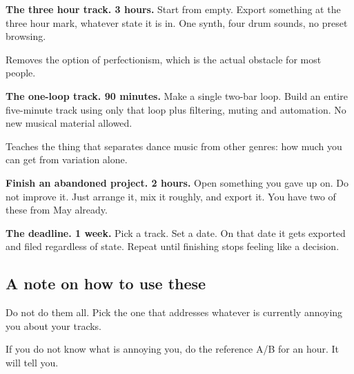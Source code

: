 \textbf{The three hour track. 3 hours.}
Start from empty. Export something at the three hour mark, whatever state it is in. One
synth, four drum sounds, no preset browsing.

Removes the option of perfectionism, which is the actual obstacle for most people.

\textbf{The one-loop track. 90 minutes.}
Make a single two-bar loop. Build an entire five-minute track using only that loop plus
filtering, muting and automation. No new musical material allowed.

Teaches the thing that separates dance music from other genres: how much you can get from
variation alone.

\textbf{Finish an abandoned project. 2 hours.}
Open something you gave up on. Do not improve it. Just arrange it, mix it roughly, and export
it. You have two of these from May already.

\textbf{The deadline. 1 week.}
Pick a track. Set a date. On that date it gets exported and filed regardless of state. Repeat
until finishing stops feeling like a decision.

\subsection{A note on how to use these}\label{pr02_exercises-a-note-on-how-to-use-these}

Do not do them all. Pick the one that addresses whatever is currently annoying you about your
tracks.

If you do not know what is annoying you, do the reference A/B for an hour. It will tell you.
